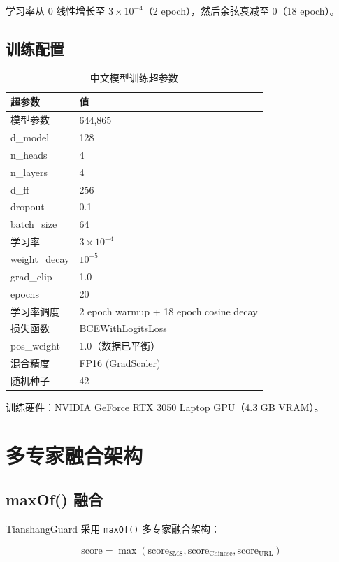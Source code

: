 \documentclass[11pt,a4paper]{article}
\begin{document}
学习率从 0 线性增长至 $3 \times 10^{-4}$（2 epoch），然后余弦衰减至 0（18 epoch）。

\subsection{训练配置}

\begin{table}[H]
\centering
\caption{中文模型训练超参数}
\begin{tabular}{ll}
\toprule
超参数 & 值 \\
\midrule
模型参数 & 644,865 \\
d\_model & 128 \\
n\_heads & 4 \\
n\_layers & 4 \\
d\_ff & 256 \\
dropout & 0.1 \\
batch\_size & 64 \\
学习率 & $3 \times 10^{-4}$ \\
weight\_decay & $10^{-5}$ \\
grad\_clip & 1.0 \\
epochs & 20 \\
学习率调度 & 2 epoch warmup + 18 epoch cosine decay \\
损失函数 & BCEWithLogitsLoss \\
pos\_weight & 1.0（数据已平衡） \\
混合精度 & FP16 (GradScaler) \\
随机种子 & 42 \\
\bottomrule
\end{tabular}
\end{table}

训练硬件：NVIDIA GeForce RTX 3050 Laptop GPU（4.3 GB VRAM）。

\section{多专家融合架构}

\subsection{maxOf() 融合}

TianshangGuard 采用 \texttt{maxOf()} 多专家融合架构：

\begin{equation}
\text{score} = \max(\text{score}_{\text{SMS}}, \text{score}_{\text{Chinese}}, \text{score}_{\text{URL}})
\end{equation}
\end{document}
